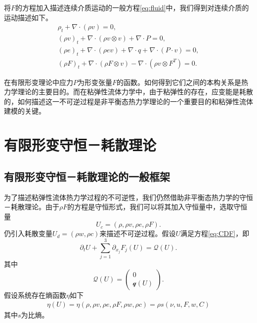 将$F$的方程加入描述连续介质运动的一般方程\eqref{eq:fluid}中，我们得到对连续介质的运动描述如下。
\begin{subequations}\label{eq:continuum}
\begin{align}
\rho_t + \nabla \cdot (\rho v )=0, \\
(\rho v)_t + \nabla \cdot (\rho v \otimes v) + \nabla \cdot P = 0, \\
(\rho e)_t + \nabla \cdot (\rho e v) + \nabla \cdot q + \nabla \cdot (P \cdot v) = 0 ,\\
(\rho F)_t + \nabla \cdot (\rho F \otimes v) - \nabla \cdot (\rho v \otimes F^T) = 0 .
\end{align}
\end{subequations}

在有限形变理论中应力$P$为形变张量$F$的函数。如何得到它们之间的本构关系是热力学理论的主要目的。而在粘弹性流体力学中，由于粘弹性的存在，应变能是耗散的，如何描述这一不可逆过程是非平衡态热力学理论的一个重要目的和粘弹性流体建模的关键。

\section{有限形变守恒－耗散理论}
\subsection{有限形变守恒－耗散理论的一般框架}
为了描述粘弹性流体热力学过程的不可逆性，我们仍然借助非平衡态热力学的守恒－耗散理论。由于$\rho F$的方程是守恒形式，我们可以将其加入守恒量中，选取守恒量
$$U_c = (\rho, \rho v, \rho e, \rho F).$$
仍引入耗散变量$U_d = (\rho w,\rho c)$来描述不可逆过程。假设$U$满足方程\eqref{eq:CDF}，即
\begin{equation}\label{eq:FCDF}
		\partial_t U + \sum_{j=1}^3 \partial_{x_j} F_j(U) = \mathcal{Q} (U) .
\end{equation}
其中
\begin{equation*}
	\mathcal{Q}(U) = \left( \begin{matrix}
		0 \\ \mathcal{q}(U)
	\end{matrix} \right).
\end{equation*}
假设系统存在熵函数$\eta$如下
\begin{eqnarray*}
\eta(U) = \eta(\rho, \rho v, \rho e,\rho F,\rho w, \rho c) = \rho s(\nu,u,F,w,C)
\end{eqnarray*}
其中$s$为比熵。

